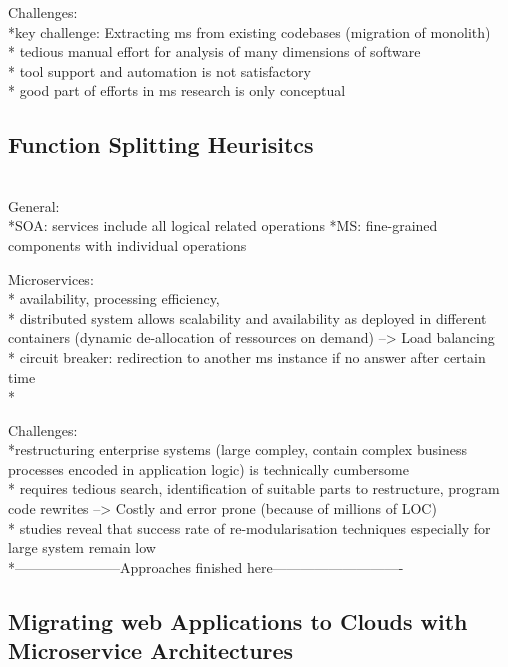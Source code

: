 Challenges:\\
*key challenge: Extracting ms from existing codebases (migration of monolith)\\
* tedious manual effort for analysis of many dimensions of software\\
* tool support and automation is not satisfactory\\
* good part of efforts in ms research is only conceptual \\

\subsection{Function Splitting Heurisitcs}
\cite{HeuristicsAlwis} \\

General: \\
*SOA: services include all logical related operations
*MS: fine-grained components with individual operations


Microservices:\\
* availability, processing efficiency,\\
* distributed system allows scalability and availability as deployed in different containers (dynamic de-allocation of ressources on demand) --> Load balancing\\
* circuit breaker: redirection to another ms instance if no answer after certain time\\
* 

Challenges:\\
*restructuring enterprise systems (large compley, contain complex business processes encoded in application logic) is technically cumbersome \\
* requires tedious search, identification of suitable parts to restructure, program code rewrites --> Costly and error prone (because of millions of LOC)\\
* studies reveal that success rate of re-modularisation techniques especially for large system remain low\\

*-----------------------Approaches finished here----------------------------\\

\subsection{Migrating web Applications to Clouds with Microservice Architectures}
\cite{MigratingCloud}

